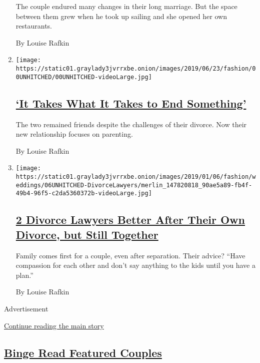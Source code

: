 \begin{enumerate}
  The couple endured many changes in their long marriage. But the space
  between them grew when he took up sailing and she opened her own
  restaurants.

  By Louise Rafkin
\item
  \texttt{[image: https://static01.graylady3jvrrxbe.onion/images/2019/06/23/fashion/00UNHITCHED/00UNHITCHED-videoLarge.jpg]}

  \hypertarget{it-takes-what-it-takes-to-end-something}{%
  \subsection{\texorpdfstring{\href{/2019/06/18/style/it-takes-what-it-takes-to-end-something.html}{`It
  Takes What It Takes to End
  Something'}}{`It Takes What It Takes to End Something'}}\label{it-takes-what-it-takes-to-end-something}}

  The two remained friends despite the challenges of their divorce. Now
  their new relationship focuses on parenting.

  By Louise Rafkin
\item
  \texttt{[image: https://static01.graylady3jvrrxbe.onion/images/2019/01/06/fashion/weddings/06UNHITCHED-DivorceLawyers/merlin\_147820818\_90ae5a89-fb4f-49b4-96f5-c2da5360372b-videoLarge.jpg]}

  \hypertarget{2-divorce-lawyers-better-after-their-own-divorce-but-still-together}{%
  \subsection{\texorpdfstring{\href{/2019/01/03/fashion/weddings/2-divorce-lawyers-better-after-their-own-divorce-but-still-together.html}{2
  Divorce Lawyers Better After Their Own Divorce, but Still
  Together}}{2 Divorce Lawyers Better After Their Own Divorce, but Still Together}}\label{2-divorce-lawyers-better-after-their-own-divorce-but-still-together}}

  Family comes first for a couple, even after separation. Their advice?
  ``Have compassion for each other and don't say anything to the kids
  until you have a plan.''

  By Louise Rafkin
\end{enumerate}

Advertisement

\protect\hyperlink{after-mid4}{Continue reading the main story}

\hypertarget{binge-read-featured-couples}{%
\subsection{\texorpdfstring{\href{/spotlight/wedding-announcements}{Binge
Read Featured
Couples}}{Binge Read Featured Couples}}\label{binge-read-featured-couples}}

